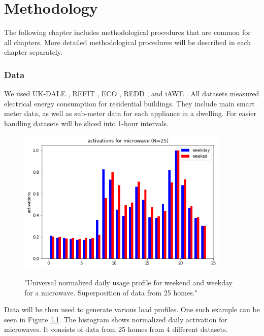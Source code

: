 
\chapter{Methodology} %

\label{Chapter3} 

The following chapter includes methodological procedures that are common for all chapters.
More detailed methodological procedures will be described in each chapter separately. 

\subsection{Data}

We used UK-DALE \cite{UKDALE}, REFIT \cite{REFIT}, ECO \cite{ECO}, REDD \cite{REDD}, and iAWE \cite{iAWE}.
All datasets measured electrical energy consumption for residential buildings. 
They include main smart meter data, as well as sub-meter data for each appliance in a dwelling. 
For easier handling datasets will be sliced into 1-hour intervals. 

\begin{figure}[H]
	\centering
	\caption{"Universal normalized daily usage profile for weekend and weekday for a microwave. Superposition of data from 25 homes."}
	\includegraphics[width=0.9\textwidth]{../Figures/microwave_norm_n25.png}
	\label{fig:UniNormMicrowave}
\end{figure}

Data will be then used to generate various load profiles. 
One such example can be seen in Figure \ref{fig:UniNormMicrowave}. The histogram shows normalized daily 
activation for microwaves. It consists of data from 25 homes from 4 different
datasets. 

